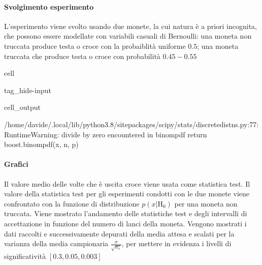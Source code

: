 \documentclass[letterpaper,10pt,italian]{jupyterBook}
\begin{document}
\paragraph{Svolgimento esperimento}
\label{\detokenize{ch/statistics/test-fisher-coin-2:svolgimento-esperimento}}
\sphinxAtStartPar
L’esperimento viene svolto usando due monete, la cui natura è a priori incognita, che possono essere modellate con variabili casuali di Bernoulli: una moneta non truccata produce testa o croce con la probaiblità uniforme \(0.5\); una moneta truccata che produce testa o croce con probabilità \(0.45 - 0.55\)

\begin{sphinxuseclass}{cell}
\begin{sphinxuseclass}{tag_hide-input}\begin{sphinxVerbatimOutput}

\begin{sphinxuseclass}{cell_output}
\begin{sphinxVerbatim}[commandchars=\\\{\}]
/home/davide/.local/lib/python3.8/site\PYGZhy{}packages/scipy/stats/\PYGZus{}discrete\PYGZus{}distns.py:77: RuntimeWarning: divide by zero encountered in \PYGZus{}binom\PYGZus{}pdf
  return \PYGZus{}boost.\PYGZus{}binom\PYGZus{}pdf(x, n, p)
\end{sphinxVerbatim}

\end{sphinxuseclass}\end{sphinxVerbatimOutput}

\end{sphinxuseclass}
\end{sphinxuseclass}

\paragraph{Grafici}
\label{\detokenize{ch/statistics/test-fisher-coin-2:grafici}}
\sphinxAtStartPar
Il valore medio delle volte che è uscita croce viene usata come statistica test. Il valore della statistica test per gli esperimenti condotti con le due monete viene confrontato con la funzione di distribuzione \(p(x|\text{H}_0)\) per una moneta non truccata. Viene mostrato l’andamento delle statistiche test e degli intervalli di accettazione in funzione del numero di lanci della moneta. Vengono mostrati i dati raccolti e successivamente depurati della media attesa e scalati per la varianza della media campionaria \(\frac{\sigma}{\sqrt{n_s}}\), per mettere in evidenza i livelli di significatività \([0.3, 0.05, 0.003]\)
\end{document}
